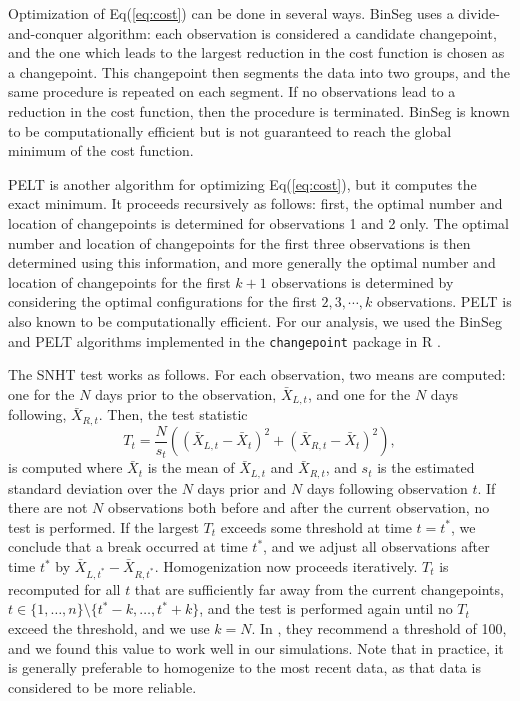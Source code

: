 \documentclass[12pt]{article}
\def\ni{\noindent}
\begin{document}
\begin{doublespacing}
Optimization of Eq(\ref{eq:cost}) can be done in several ways.  BinSeg uses a divide-and-conquer algorithm: each observation is considered a candidate changepoint, and the one which leads to the largest reduction in the cost function is chosen as a changepoint.  This changepoint then segments the data into two groups, and the same procedure is repeated on each segment.  If no observations lead to a reduction in the cost function, then the procedure is terminated.  BinSeg is known to be computationally efficient but is not guaranteed to reach the global minimum of the cost function.

PELT is another algorithm for optimizing Eq(\ref{eq:cost}), but it computes the exact minimum.  It proceeds recursively as follows: first, the optimal number and location of changepoints is determined for observations 1 and 2 only.  The optimal number and location of changepoints for the first three observations is then determined using this information, and more generally the optimal number and location of changepoints for the first $k+1$ observations is determined by considering the optimal configurations for the first $2, 3, \cdots, k$ observations.  PELT is also known to be computationally efficient.  For our analysis, we used the BinSeg and PELT algorithms implemented in the \texttt{changepoint} package in R \cite{killick14}.

The SNHT test works as follows.  For each observation, two means are computed: one for the $N$ days prior to the observation, $\bar{X}_{L,t}$, and one for the $N$ days following, $\bar{X}_{R,t}$.  Then, the test statistic
\begin{equation}
	T_t = \frac{N}{s_t}\left( (\bar{X}_{L,t}-\bar{X}_t)^2 + (\bar{X}_{R,t}-\bar{X}_t)^2\right),
	\label{eq:Hom}
\end{equation}
\ni is computed where $\bar{X}_t$ is the mean of $\bar{X}_{L,t}$ and $\bar{X}_{R,t}$, and $s_t$ is the estimated standard deviation over the $N$ days prior and $N$ days following observation $t$.  If there are not $N$ observations both before and after the current observation, no test is performed.  If the largest $T_t$ exceeds some threshold at time $t=t^*$, we conclude that a break occurred at time $t^*$, and we adjust all observations after time $t^*$ by $\bar{X}_{L,t^*}-\bar{X}_{R,t^*}$.  Homogenization now proceeds iteratively.  $T_t$ is recomputed for all $t$ that are sufficiently far away from the current changepoints, $t\in\{1,\ldots,n\} \setminus \{t^*-k, \ldots, t^*+k\}$, and the test is performed again until no $T_t$ exceed the threshold, and we use $k=N$.  In \cite{haimberger07}, they recommend a threshold of 100, and we found this value to work well in our simulations.  Note that in practice, it is generally preferable to homogenize to the most recent data, as that data is considered to be more reliable.


\end{doublespacing}
\end{document}
